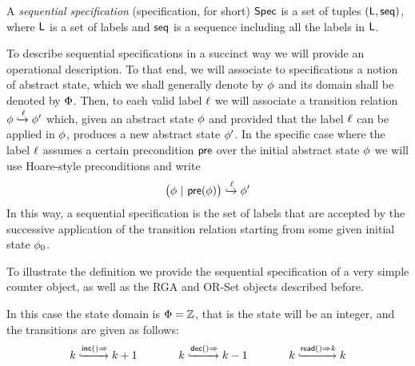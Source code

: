 
\begin{definition}
  \label{definition:sequential specification} A \emph{sequential
  specification} (specification, for short) $\Spec$ is a set of tuples $(\alabelset, \aseqord)$, where
  $\alabelset$ is a set of labels and
  $\aseqord$ is a sequence including all the labels in $\alabelset$.
\end{definition}

To describe sequential specifications in a succinct way we will
provide an operational description.
To that end, we will associate to specifications a notion of abstract
state, which we shall generally denote by $\abstate$ and its domain
shall be denoted by $\abstates$.
Then, to each valid label $\alabel$ we will associate a transition
relation $\abstate \specarrow{\alabel}  \abstate'$ which, given an
abstract state $\abstate$ and
provided that the label $\alabel$ can be applied in $\abstate$, produces a new
abstract state $\abstate'$.
%
In the specific case where the label $\alabel$ assumes a certain
precondition $\apre$ over the initial abstract state $\abstate$ we
will use Hoare-style preconditions and write
\[ \big(\abstate\ |\ \apre(\abstate)\big) \specarrow{\alabel}
  \abstate' \] In this way, a sequential specification is the set
of labels that are accepted by the successive application of the
transition relation starting from some given initial state
$\abstate_{0}$.

To illustrate the definition we provide the sequential specification
of a very simple counter object, as well as the RGA and OR-Set objects
described before.
\begin{example}
  \label{definition:sequential specification of counter} In this case
  the state domain is $\abstates = \mathbb{Z}$, that is the state will
  be an integer, and the transitions are given as follows:
\[\small
  k \specarrow{\alabellong[\mathsf{inc}]{}{}} k+1\qquad\qquad
  k \specarrow{\alabellong[\mathsf{dec}]{}{}} k-1\qquad\qquad
  k \specarrow{\alabellong[\mathsf{read}]{}{k}} k
\]
\end{example}

